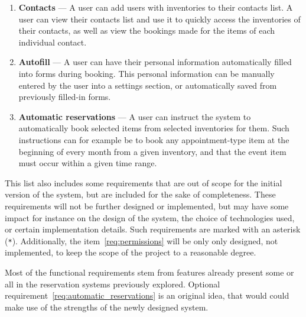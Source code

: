\begin{enumerate}[label=\textbf{F\arabic*}, ref=\labelenumi]
    \item \label{req:contacts} \textbf{Contacts} --- A user can add users with inventories to their contacts list. A user can view their contacts list and use it to quickly access the inventories of their contacts, as well as view the bookings made for the items of each individual contact.
    \item \label{req:autofill} \textbf{Autofill} --- A user can have their personal information automatically filled into forms during booking. This personal information can be manually entered by the user into a settings section, or automatically saved from previously filled-in forms.
    \item \label{req:automatic_reservations} \textbf{Automatic reservations} --- A user can instruct the system to automatically book selected items from selected inventories for them. Such instructions can for example be to book any appointment-type item at the beginning of every month from a given inventory, and that the event item must occur within a given time range.
\end{enumerate}

This list also includes some requirements that are out of scope for the initial version of the system, but are included for the sake of completeness. These requirements will not be further designed or implemented, but may have some impact for instance on the design of the system, the choice of technologies used, or certain implementation details. Such requirements are marked with an asterisk (\texttt{*}). Additionally, the item~\ref{req:permissions} will be only only designed, not implemented, to keep the scope of the project to a reasonable degree.

Most of the functional requirements stem from features already present some or all in the reservation systems previously explored. Optional requirement~\ref{req:automatic_reservations} is an original idea, that would could make use of the strengths of the newly designed system.
